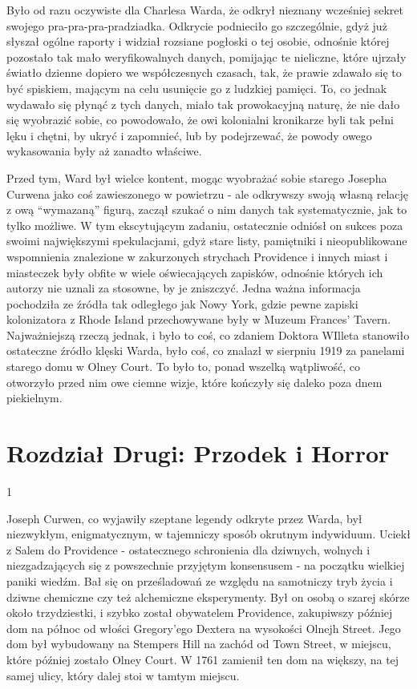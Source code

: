 Było od razu oczywiste dla Charlesa Warda, że odkrył nieznany wcześniej sekret swojego pra-pra-pra-pradziadka. Odkrycie podnieciło go szczególnie, gdyż już słyszał ogólne raporty i widział rozsiane pogłoski o tej osobie, odnośnie której pozostało tak mało weryfikowalnych danych, pomijając te nieliczne, które ujrzały światło dzienne dopiero we współczesnych czasach, tak, że prawie zdawało się to być spiskiem, mającym na celu usunięcie go z ludzkiej pamięci. To, co jednak wydawało się płynąć z tych danych, miało tak prowokacyjną naturę, że nie dało się wyobrazić sobie, co powodowało, że owi kolonialni kronikarze byli tak pełni lęku i chętni, by ukryć i zapomnieć, lub by podejrzewać, że powody owego wykasowania były aż zanadto właściwe. 

Przed tym, Ward był wielce kontent, mogąc wyobrażać sobie starego Josepha Curwena jako coś zawieszonego w powietrzu - ale odkrywszy swoją własną relację z ową ``wymazaną'' figurą, zaczął szukać o nim danych tak systematycznie, jak to tylko możliwe. W tym ekscytującym zadaniu, ostatecznie odniósł on sukces poza swoimi największymi spekulacjami, gdyż stare listy, pamiętniki i nieopublikowane wspomnienia znalezione w zakurzonych strychach Providence i innych miast i miasteczek były obfite w wiele oświecających zapisków, odnośnie których ich autorzy nie uznali za stosowne, by je zniszczyć. Jedna ważna informacja pochodziła ze źródła tak odległego jak Nowy York, gdzie pewne zapiski kolonizatora z Rhode Island przechowywane były w Muzeum Frances' Tavern. Najważniejszą rzeczą jednak, i było to coś, co zdaniem Doktora WIlleta stanowiło ostateczne źródło klęski Warda, było coś, co znalazł w sierpniu 1919 za panelami starego domu w Olney Court. To było to, ponad wszelką wątpliwość, co otworzyło przed nim owe ciemne wizje, które kończyły się daleko poza dnem piekielnym. 


\newpage

\section{Rozdział Drugi: Przodek i Horror}

\begin{center}
1
\end{center}

Joseph Curwen, co wyjawiły szeptane legendy odkryte przez Warda, był niezwykłym, enigmatycznym, w tajemniczy sposób okrutnym indywiduum. Uciekł z Salem do Providence - ostatecznego schronienia dla dziwnych, wolnych i niezgadzających się z powszechnie przyjętym konsensusem - na początku wielkiej paniki wiedźm. Bał się on prześladowań ze względu na samotniczy tryb życia i dziwne chemiczne czy też alchemiczne eksperymenty. Był on osobą o szarej skórze około trzydziestki, i szybko został obywatelem Providence, zakupiwszy później dom na północ od włości Gregory'ego Dextera na wysokości Olnejh Street. Jego dom był wybudowany na Stempers Hill na zachód od Town Street, w miejscu, które później zostało Olney Court. W 1761 zamienił ten dom na większy, na tej samej ulicy, który dalej stoi w tamtym miejscu.

